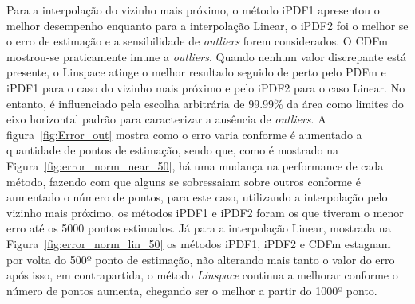 Para a interpolação do vizinho mais próximo, o método \ac{iPDF1} apresentou o melhor desempenho enquanto para a interpolação Linear, o \ac{iPDF2} foi o melhor se o erro de estimação e a sensibilidade de \textit{outliers} forem considerados. O \ac{CDFm} mostrou-se praticamente imune a \textit{outliers}. Quando nenhum valor discrepante está presente, o Linspace atinge o melhor resultado seguido de perto pelo \ac{PDFm} e \ac{iPDF1} para o caso do vizinho mais próximo e pelo \ac{iPDF2} para o caso Linear. No entanto, é influenciado pela escolha arbitrária de 99.99\% da área como limites do eixo horizontal padrão para caracterizar a ausência de \textit{outliers}. 
A figura~\ref{fig:Error_out} mostra como o erro varia conforme é aumentado a quantidade de pontos de estimação, sendo que, como é mostrado na Figura~\ref{fig:error_norm_near_50}, há uma mudança na performance de cada método, fazendo com que alguns se sobressaiam sobre outros conforme é aumentado o número de pontos, para este caso, utilizando a interpolação pelo vizinho mais próximo, os métodos \ac{iPDF1} e \ac{iPDF2} foram os que tiveram o menor erro até os 5000 pontos estimados. Já para a interpolação Linear, mostrada na Figura~\ref{fig:error_norm_lin_50} os métodos \ac{iPDF1}, \ac{iPDF2} e \ac{CDFm} estagnam por volta do 500º ponto de estimação, não alterando mais tanto o valor do erro após isso, em contrapartida, o método \textit{Linspace} continua a melhorar conforme o número de pontos aumenta, chegando ser o melhor a partir do 1000º ponto. 

